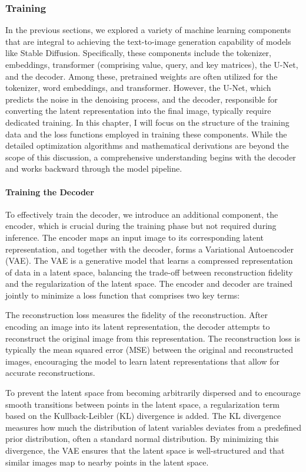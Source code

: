 \documentclass[11pt]{article}
\begin{document}
\subsubsection{Training}
In the previous sections, we explored a variety of machine learning components that are integral to achieving the text-to-image generation capability of models like Stable Diffusion. Specifically, these components include the tokenizer, embeddings, transformer (comprising value, query, and key matrices), the U-Net, and the decoder. Among these, pretrained weights are often utilized for the tokenizer, word embeddings, and transformer. However, the U-Net, which predicts the noise in the denoising process, and the decoder, responsible for converting the latent representation into the final image, typically require dedicated training. In this chapter, I will focus on the structure of the training data and the loss functions employed in training these components. While the detailed optimization algorithms and mathematical derivations are beyond the scope of this discussion, a comprehensive understanding begins with the decoder and works backward through the model pipeline.

\paragraph{Training the Decoder}
To effectively train the decoder, we introduce an additional component, the encoder, which is crucial during the training phase but not required during inference. The encoder maps an input image to its corresponding latent representation, and together with the decoder, forms a Variational Autoencoder (VAE)\cite{kingma2022autoencodingvariationalbayes}. The VAE is a generative model that learns a compressed representation of data in a latent space, balancing the trade-off between reconstruction fidelity and the regularization of the latent space. The encoder and decoder are trained jointly to minimize a loss function that comprises two key terms:

The reconstruction loss measures the fidelity of the reconstruction. After encoding an image into its latent representation, the decoder attempts to reconstruct the original image from this representation. The reconstruction loss is typically the mean squared error (MSE) between the original and reconstructed images, encouraging the model to learn latent representations that allow for accurate reconstructions.

To prevent the latent space from becoming arbitrarily dispersed and to encourage smooth transitions between points in the latent space, a regularization term based on the Kullback-Leibler (KL) divergence is added. The KL divergence measures how much the distribution of latent variables deviates from a predefined prior distribution, often a standard normal distribution. By minimizing this divergence, the VAE ensures that the latent space is well-structured and that similar images map to nearby points in the latent space.
\end{document}

